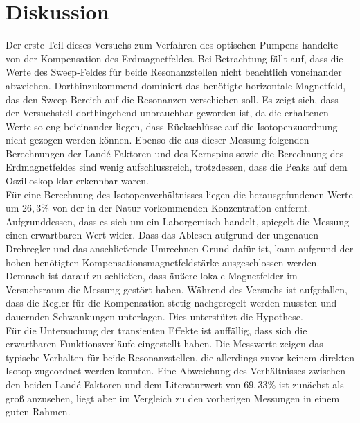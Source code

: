 \section{Diskussion}
Der erste Teil dieses Versuchs zum Verfahren des optischen Pumpens handelte von der Kompensation des Erdmagnetfeldes.
Bei Betrachtung fällt auf, dass die Werte des Sweep-Feldes für beide Resonanzstellen nicht beachtlich voneinander abweichen. Dorthinzukommend dominiert das benötigte horizontale Magnetfeld, das den Sweep-Bereich auf die Resonanzen verschieben soll.
Es zeigt sich, dass der Versuchsteil dorthingehend unbrauchbar geworden ist, da die erhaltenen Werte so eng beieinander liegen, dass Rückschlüsse auf die Isotopenzuordnung nicht gezogen werden können. Ebenso die aus dieser Messung folgenden Berechnungen der Landé-Faktoren und des Kernspins sowie die Berechnung des Erdmagnetfeldes sind wenig aufschlussreich, trotzdessen, dass die Peaks auf dem Oszilloskop klar erkennbar waren.\\
Für eine Berechnung des Isotopenverhältnisses liegen die herausgefundenen Werte um $26,3\%$ von der in der Natur vorkommenden Konzentration entfernt.
Aufgrunddessen, dass es sich um ein Laborgemisch handelt, spiegelt die Messung einen erwartbaren Wert wider.
Dass das Ablesen aufgrund der ungenauen Drehregler und das anschließende Umrechnen Grund dafür ist, kann aufgrund der hohen benötigten Kompensationsmagnetfeldstärke ausgeschlossen werden. Demnach ist darauf zu schließen, dass äußere lokale Magnetfelder im Versuchsraum die Messung gestört haben. Während des Versuchs ist aufgefallen, dass die Regler für die Kompensation stetig nachgeregelt werden mussten und dauernden Schwankungen unterlagen. Dies unterstützt die Hypothese.\\
Für die Untersuchung der transienten Effekte ist auffällig, dass sich die erwartbaren Funktionsverläufe eingestellt haben.
Die Messwerte zeigen das typische Verhalten für beide Resonanzstellen, die allerdings zuvor keinem direkten Isotop zugeordnet werden konnten. Eine Abweichung des Verhältnisses zwischen den beiden Landé-Faktoren und dem Literaturwert von $69,33\%$ ist zunächst als groß anzusehen, liegt aber im Vergleich zu den vorherigen Messungen in einem guten Rahmen.
